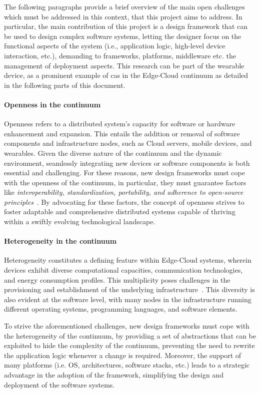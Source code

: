 \documentclass[12pt,a4paper]{article}
\begin{document}
The following paragraphs provide a brief overview of the main open challenges which must be addressed in this context,
that this project aims to address.
%
In particular,
the main contribution of this project is a design framework that can be used to design complex software systems,
letting the designer focus on the functional aspects of the system (i.e., application logic, high-level device interaction, etc.),
demanding to frameworks, platforms, middleware etc. the management of deployment aspects.
This research can be part of the wearable device,
as a prominent example of \ac{cas} in the Edge-Cloud continuum as detailed in the following parts of this document.

\paragraph{Openness in the continuum}
Openness refers to a distributed system's capacity for software or hardware enhancement and expansion.
%
This entails the addition or removal of software components and infrastructure nodes,
such as Cloud servers, mobile devices, and wearables.
%
Given the diverse nature of the continuum and the dynamic environment,
seamlessly integrating new devices or software components is both essential and challenging.
%
For these reasons,
new design frameworks must cope with the openness of the continuum,
in particular,
they must guarantee factors like \emph{interoperability, standardization, portability, and adherence to open-source principles}~\cite{DBLP:journals/computing/SteenT16}.
%
By advocating for these factors,
the concept of openness strives to foster adaptable and comprehensive distributed systems capable of thriving within a swiftly evolving technological landscape.

\paragraph{Heterogeneity in the continuum}
Heterogeneity constitutes a defining feature within Edge-Cloud systems,
wherein devices exhibit diverse computational capacities,
communication technologies, and energy consumption profiles.
%
This multiplicity poses challenges in the provisioning and establishment of the underlying infrastructure~\cite{DBLP:conf/synasc/VladusicR20}.
%
This diversity is also evident at the software level,
with many nodes in the infrastructure running different operating systems,
programming languages,
and software elements.

To strive the aforementioned challenges,
new design frameworks must cope with the heterogeneity of the continuum,
by providing a set of abstractions that can be exploited to hide the complexity of the continuum,
preventing the need to rewrite the application logic whenever a change is required.
%
Moreover,
the support of many platforms (i.e. OS, architectures, software stacks, etc.) leads to a strategic advantage in the adoption of the framework,
simplifying the design and deployment of the software systems.
\end{document}
